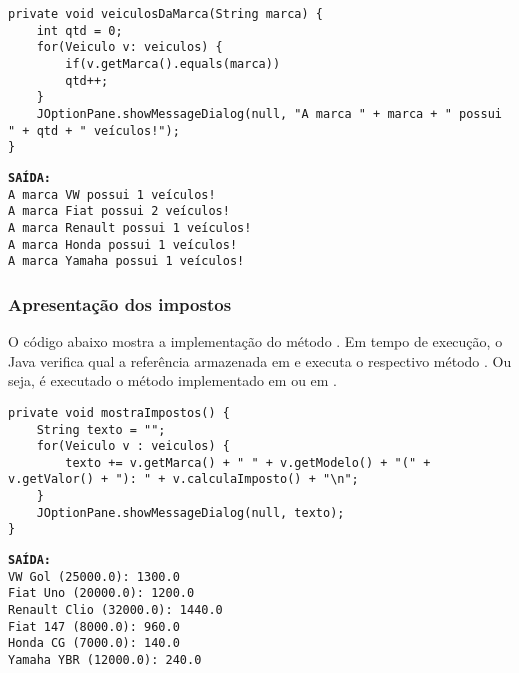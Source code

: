 \begin{verbatim}
private void veiculosDaMarca(String marca) {
	int qtd = 0;
	for(Veiculo v: veiculos) {
		if(v.getMarca().equals(marca))
		qtd++;
	}
	JOptionPane.showMessageDialog(null, "A marca " + marca + " possui " + qtd + " veículos!");
}
\end{verbatim}

\begin{minipage}{\textwidth}
	\textbf{\texttt{SAÍDA:}}\\
	\texttt{A marca VW possui 1 veículos!}\\
	\texttt{A marca Fiat possui 2 veículos!}\\
	\texttt{A marca Renault possui 1 veículos!}\\
	\texttt{A marca Honda possui 1 veículos!}\\
	\texttt{A marca Yamaha possui 1 veículos!}
\end{minipage}

\subsubsection{Apresentação dos impostos}

O código abaixo mostra a implementação do método . Em tempo de execução, o Java verifica qual a referência armazenada em  e executa o respectivo método . Ou seja, é executado o método implementado em  ou em .

\begin{verbatim}
private void mostraImpostos() {
	String texto = "";
	for(Veiculo v : veiculos) {
		texto += v.getMarca() + " " + v.getModelo() + "(" + v.getValor() + "): " + v.calculaImposto() + "\n";
	}
	JOptionPane.showMessageDialog(null, texto);
}
\end{verbatim}

\begin{minipage}{\textwidth}
	\textbf{\texttt{SAÍDA:}}\\
	\texttt{VW Gol (25000.0): 1300.0}\\
	\texttt{Fiat Uno (20000.0): 1200.0}\\
	\texttt{Renault Clio (32000.0): 1440.0}\\
	\texttt{Fiat 147 (8000.0): 960.0}\\
	\texttt{Honda CG (7000.0): 140.0}\\
	\texttt{Yamaha YBR (12000.0): 240.0}
\end{minipage}

